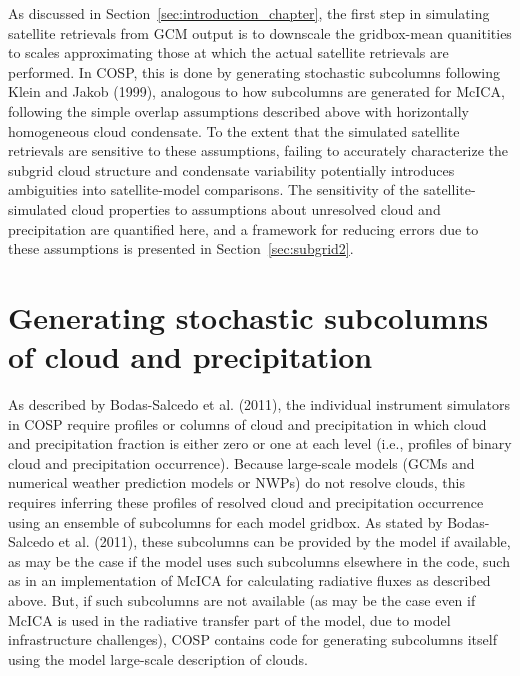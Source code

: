 As discussed in Section~\ref{sec:introduction_chapter}, the first step
in simulating satellite retrievals from GCM output is to downscale the
gridbox-mean quanitities to scales approximating those at which the
actual satellite retrievals are performed. In COSP, this is done by
generating stochastic subcolumns following Klein and Jakob (1999),
analogous to how subcolumns are generated for McICA, following the
simple overlap assumptions described above with horizontally homogeneous
cloud condensate. To the extent that the simulated satellite retrievals
are sensitive to these assumptions, failing to accurately characterize
the subgrid cloud structure and condensate variability potentially
introduces ambiguities into satellite-model comparisons. The sensitivity
of the satellite-simulated cloud properties to assumptions about
unresolved cloud and precipitation are quantified here, and a framework
for reducing errors due to these assumptions is presented in
Section~\ref{sec:subgrid2}.

\section{Generating stochastic subcolumns of cloud and
precipitation}\label{sec:subgridux5fscops}

As described by Bodas-Salcedo et al. (2011), the individual instrument
simulators in COSP require profiles or columns of cloud and
precipitation in which cloud and precipitation fraction is either zero
or one at each level (i.e., profiles of binary cloud and precipitation
occurrence). Because large-scale models (GCMs and numerical weather
prediction models or NWPs) do not resolve clouds, this requires
inferring these profiles of resolved cloud and precipitation occurrence
using an ensemble of subcolumns for each model gridbox. As stated by
Bodas-Salcedo et al. (2011), these subcolumns can be provided by the
model if available, as may be the case if the model uses such subcolumns
elsewhere in the code, such as in an implementation of McICA for
calculating radiative fluxes as described above. But, if such subcolumns
are not available (as may be the case even if McICA is used in the
radiative transfer part of the model, due to model infrastructure
challenges), COSP contains code for generating subcolumns itself using
the model large-scale description of clouds.


